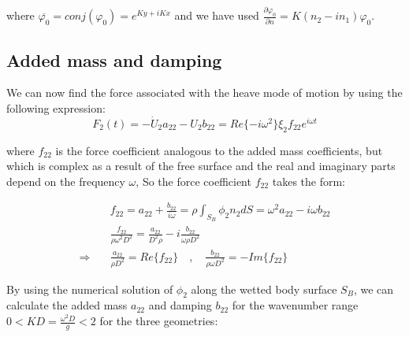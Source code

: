 \documentclass[a4paper,10pt]{article}
\newcommand{\dd}{\partial}
\begin{document}
where $\overline{\varphi_0} = conj({\varphi_0}) = e^{K y + i K x}$ and we have used $\frac{\dd \varphi_0}{\dd n} = K(n_2 - i n_1) \varphi_0$.

\subsection{Added mass and damping}
We can now find the force associated with the heave mode of motion by using the following expression:
\begin{equation}
F_2 (t) = - \dot{U}_2 a_{22} - U_2 b_{22} =  Re\{- i\omega^2\} \xi_2 f_{22} e^{i \omega t}
\end{equation}

where $f_{22}$ is the force coefficient analogous to the added mass coefficients, but which is complex as a result of the free surface and the real and imaginary parts depend on the frequency $\omega$, So the force coefficient $f_{22}$ takes the form:

\begin{align}
&f_{22} = a_{22} + \frac{b_{22}}{i \omega} = \rho \int_{S_B} \phi_2 n_2 dS= \omega^2 a_{22} - i \omega b_{22}\\[1 em]
&\frac{f_{22}}{\rho \omega^2 D^2} = \frac{a_{22}}{D^2 \rho} - i \frac{b_{22}}{\omega \rho D^2}\\[1 em]
\Rightarrow \quad &\frac{a_{22}}{\rho D^2} = Re\{f_{22}\} \quad , \quad \frac{b_{22}}{\rho \omega D^2} = -Im\{f_{22}\}
\end{align}

By using the numerical solution of $\phi_2$ along the wetted body surface $S_B$, we can calculate the added mass $a_{22}$ and damping $b_{22}$ for the wavenumber range $0 < KD=\frac{\omega^2 D}{g} < 2$ for the three geometries:
\end{document}
